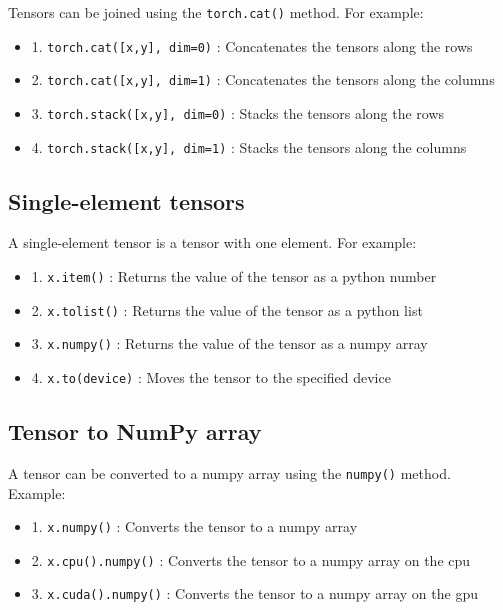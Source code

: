 \documentclass{article}
\begin{document}
Tensors can be joined using the \texttt{torch.cat()} method. For example:

\begin{itemize}
    \item 1. \texttt{torch.cat([x,y], dim=0)} : Concatenates the tensors along the rows
    \item 2. \texttt{torch.cat([x,y], dim=1)} : Concatenates the tensors along the columns
    \item 3. \texttt{torch.stack([x,y], dim=0)} : Stacks the tensors along the rows
    \item 4. \texttt{torch.stack([x,y], dim=1)} : Stacks the tensors along the columns
\end{itemize}

\subsection{Single-element tensors}

A single-element tensor is a tensor with one element. For example:

\begin{itemize}
    \item 1. \texttt{x.item()} : Returns the value of the tensor as a python number
    \item 2. \texttt{x.tolist()} : Returns the value of the tensor as a python list
    \item 3. \texttt{x.numpy()} : Returns the value of the tensor as a numpy array
    \item 4. \texttt{x.to(device)} : Moves the tensor to the specified device
\end{itemize}

\subsection{Tensor to NumPy array}

A tensor can be converted to a numpy array using the \texttt{numpy()} method. Example:

\begin{itemize}
    \item 1. \texttt{x.numpy()} : Converts the tensor to a numpy array
    \item 2. \texttt{x.cpu().numpy()} : Converts the tensor to a numpy array on the cpu
    \item 3. \texttt{x.cuda().numpy()} : Converts the tensor to a numpy array on the gpu
\end{itemize}
\end{document}
